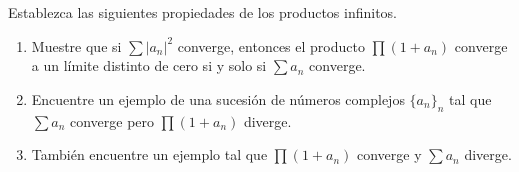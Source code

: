 \setcounter{eje}{6}
\begin{ejer}
Establezca las siguientes propiedades de los productos infinitos.
\begin{enumerate}[label=(\alph*), leftmargin = 1.5em]
    \item Muestre que si $\sum |a_n|^2$ converge, entonces el producto $\prod (1+a_n)$ converge a un límite distinto de cero si y solo si $\sum a_n$ converge.
    \item Encuentre un ejemplo de una sucesión de números complejos $\{a_n\}_n$ tal que $\sum a_n$ converge pero $\prod (1+a_n)$ diverge.
    \item También encuentre un ejemplo tal que $\prod (1+a_n)$ converge y $\sum a_n$ diverge.
\end{enumerate}
\end{ejer}
